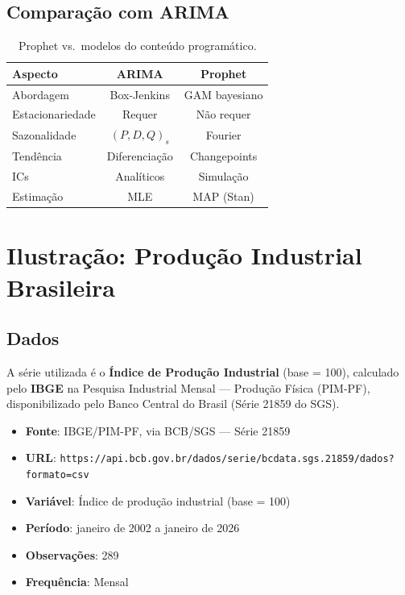 \documentclass[12pt, a4paper]{article}
\begin{document}
\subsection{Comparação com ARIMA}

\begin{table}[H]
\centering
\caption{Prophet vs.\ modelos do conteúdo programático.}
\begin{tabular}{lcc}
    \toprule
    \textbf{Aspecto} & \textbf{ARIMA} & \textbf{Prophet} \\
    \midrule
    Abordagem & Box-Jenkins & GAM bayesiano \\
    Estacionariedade & Requer & Não requer \\
    Sazonalidade & $(P,D,Q)_s$ & Fourier \\
    Tendência & Diferenciação & Changepoints \\
    ICs & Analíticos & Simulação \\
    Estimação & MLE & MAP (Stan) \\
    \bottomrule
\end{tabular}
\end{table}

\section{Ilustração: Produção Industrial Brasileira}

\subsection{Dados}

A série utilizada é o \textbf{Índice de Produção Industrial}
(base = 100), calculado pelo \textbf{IBGE} na Pesquisa Industrial
Mensal --- Produção Física (PIM-PF), disponibilizado pelo Banco
Central do Brasil (Série 21859 do SGS).

\begin{itemize}[nosep]
    \item \textbf{Fonte}: IBGE/PIM-PF, via BCB/SGS --- Série 21859
    \item \textbf{URL}: \nolinkurl{https://api.bcb.gov.br/dados/serie/bcdata.sgs.21859/dados?formato=csv}
    \item \textbf{Variável}: Índice de produção industrial (base = 100)
    \item \textbf{Período}: janeiro de 2002 a janeiro de 2026
    \item \textbf{Observações}: 289
    \item \textbf{Frequência}: Mensal
\end{itemize}
\end{document}
